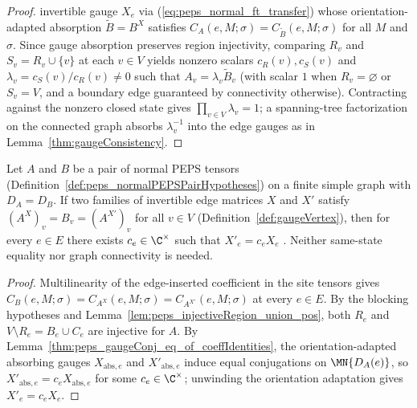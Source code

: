 \begin{corollary}
\begin{proof}
        invertible gauge $X_e$ via (\ref{eq:peps_normal_ft_transfer}) whose
        orientation-adapted absorption $\widetilde B=B^X$ satisfies
        $C_A(e,M;\sigma)=C_{\widetilde B}(e,M;\sigma)$ for all $M$ and $\sigma$.
        Since gauge absorption preserves region injectivity, comparing $R_v$ and
        $S_v=R_v\cup\{v\}$ at each $v\in V$ yields nonzero scalars $c_R(v),c_S(v)$
        and $\lambda_v=c_S(v)/c_R(v)\ne 0$ such that
        $A_v=\lambda_v\widetilde B_v$ (with scalar $1$ when $R_v=\varnothing$ or
        $S_v=V$, and a boundary edge guaranteed by connectivity otherwise).
        Contracting against the nonzero closed state gives
        $\prod_{v\in V}\lambda_v=1$; a spanning-tree factorization on the
        connected graph absorbs $\lambda_v^{-1}$ into the edge gauges as in
        Lemma~\ref{thm:gaugeConsistency}.
    \end{proof}
\end{corollary}

\begin{lemma}%
    \label{thm:fundamentalTheorem_normalPEPS_gauge_unique}
    \leanok
    Let $A$ and $B$ be a pair of normal PEPS tensors
    (Definition~\ref{def:peps_normalPEPSPairHypotheses}) on a finite simple
    graph with $D_A=D_B$. If two families of invertible edge matrices $X$ and
    $X'$ satisfy $(A^X)_v=B_v=(A^{X'})_v$ for all $v\in V$
    (Definition~\ref{def:gaugeVertex}), then for every $e\in E$ there exists
    $c_e\in\C^\times$ such that $X'_e=c_e X_e$
    \cite[Section~4, following Theorem~3]{Molnar2018NormalPEPS}. Neither same-state
    equality nor graph connectivity is needed.
    \begin{proof}
        \leanok
        Multilinearity of the edge-inserted coefficient in the site tensors gives
        $C_B(e,M;\sigma)=C_{A^X}(e,M;\sigma)=C_{A^{X'}}(e,M;\sigma)$ at every
        $e\in E$. By the blocking hypotheses and
        Lemma~\ref{lem:peps_injectiveRegion_union_pos}, both $R_e$ and
        $V\setminus R_e=B_e\cup C_e$ are injective for $A$. By
        Lemma~\ref{thm:peps_gaugeConj_eq_of_coeffIdentities}, the orientation-adapted
        absorbing gauges $X_{\mathrm{abs},e}$ and $X'_{\mathrm{abs},e}$ induce
        equal conjugations on $\MN{D_A(e)}$, so
        $X'_{\mathrm{abs},e}=c_e X_{\mathrm{abs},e}$ for some $c_e\in\C^\times$;
        unwinding the orientation adaptation gives $X'_e=c_e X_e$.
    \end{proof}
\end{lemma}


